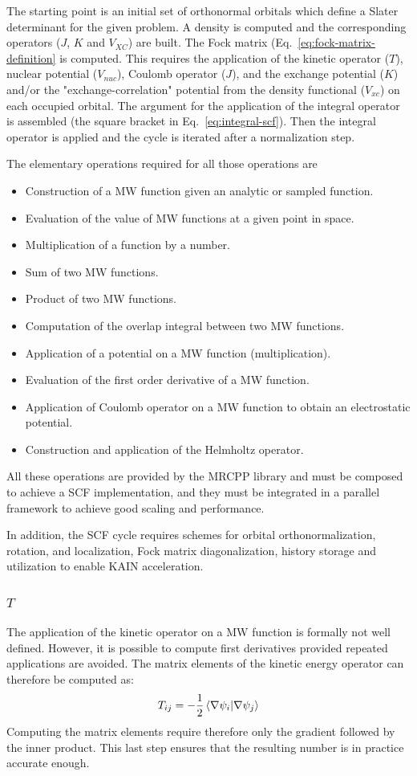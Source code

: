 \documentclass[%
 aip,
 amsmath,amssymb,
 reprint,%
]{revtex4-1}
\begin{document}
The starting point is an initial set of orthonormal orbitals which define a Slater determinant for the given problem. A density is computed and the corresponding operators ($J$, $K$ and $V_{XC}$) are built. The Fock matrix (Eq.~\ref{eq:fock-matrix-definition} is computed. This requires the application of the kinetic operator ($T$), nuclear  potential ($V_{nuc}$), Coulomb operator ($J$), and  the exchange potential ($K$) and/or the "exchange-correlation" potential from the density functional ($V_{xc}$) on each occupied orbital. The argument for the application of the integral operator is assembled (the square bracket in Eq.~\ref{eq:integral-scf}). Then the integral operator is applied and the cycle is iterated after a normalization step. 

The elementary operations required for all those operations are
\begin{itemize}
\item Construction of a MW function given an analytic or sampled function.
\item Evaluation of the value of MW functions at a given point in space.
\item Multiplication of a function by a number.
\item Sum of two MW functions.
\item Product of two MW functions.
\item Computation of the overlap integral between two MW functions.
\item Application of a potential on a MW function (multiplication).
\item Evaluation of the first order derivative of a MW function.
\item Application of Coulomb operator on a MW function to obtain an electrostatic potential.
\item Construction and application of the Helmholtz operator.
\end{itemize}


All these operations are provided by the MRCPP library\cite{mrcpp} and must be composed to achieve a SCF implementation, and they must be integrated in a parallel framework to achieve good scaling and performance.

In addition, the SCF cycle requires schemes for orbital orthonormalization, rotation, and localization, Fock matrix diagonalization, history storage and utilization to enable KAIN acceleration.~\cite{kain}

\subsubsection{$T$}
The application of the kinetic operator on a MW function is formally not well defined. However, it is possible to compute first derivatives provided repeated applications are avoided. The matrix elements of the kinetic energy operator can therefore be computed as:
\begin{equation}
  T_{ij} = -\frac{1}{2} \braket{\nabla \psi_i | \nabla \psi_j}
\end{equation}
Computing the matrix elements require therefore only the gradient followed by the inner product. This last step ensures that the resulting number is in practice accurate enough.\cite{derivative-paper}
\end{document}
